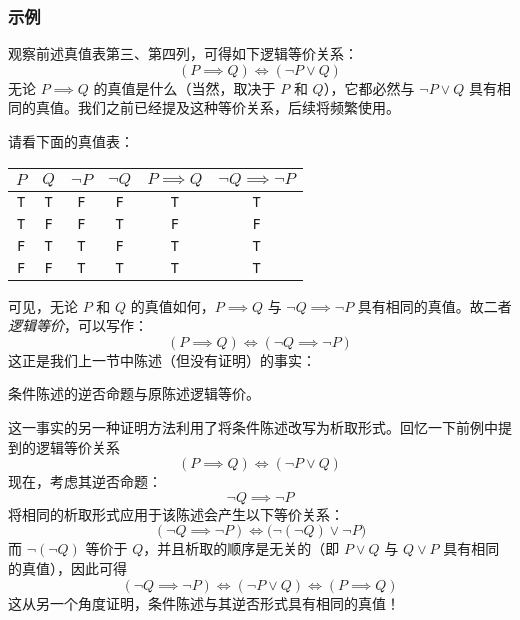 \subsubsection*{示例}

\begin{example}
    观察前述真值表第三、第四列，可得如下逻辑等价关系：
    \[(P \implies Q) \iff (\neg P \lor Q)\]
    无论 $P \implies Q$ 的真值是什么（当然，取决于 $P$ 和 $Q$），它都必然与 $\neg P \lor Q$ 具有相同的真值。我们之前已经提及这种等价关系，后续将频繁使用。
\end{example}

\begin{example}
    请看下面的真值表：
    \begin{center}
        \begin{tabular}{c|c|c|c|c|c}
              $P$      & $Q$      & $\neg P$ &  $\neg Q$  & $P \implies Q$ & $\neg Q \implies \neg P$ \\
              \hline
              \verb|T| & \verb|T| & \verb|F| &  \verb|F|  &    \verb|T|    &    \verb|T|    \\
              \verb|T| & \verb|F| & \verb|F| &  \verb|T|  &    \verb|F|    &    \verb|F|    \\
              \verb|F| & \verb|T| & \verb|T| &  \verb|F|  &    \verb|T|    &    \verb|T|    \\
              \verb|F| & \verb|F| & \verb|T| &  \verb|T|  &    \verb|T|    &    \verb|T|    \\
        \end{tabular}
    \end{center}
    可见，无论 $P$ 和 $Q$ 的真值如何，$P \implies Q$ 与 $\neg Q \implies \neg P$ 具有相同的真值。故二者\emph{逻辑等价}，可以写作：
    \[(P \implies Q) \iff (\neg Q \implies \neg P)\]
    这正是我们上一节中陈述（但没有证明）的事实：
    \begin{center}
        条件陈述的逆否命题与原陈述逻辑等价。
    \end{center}

    这一事实的另一种证明方法利用了将条件陈述改写为析取形式。回忆一下前例中提到的逻辑等价关系
    \[(P \implies Q) \iff (\neg P \lor Q)\]
    现在，考虑其逆否命题：
    \[\neg Q \implies \neg P\]
    将相同的析取形式应用于该陈述会产生以下等价关系：
    \[(\neg Q \implies \neg P) \iff \big(\neg(\neg Q) \lor \neg P\big)\]
    而 $\neg(\neg Q)$ 等价于 $Q$，并且析取的顺序是无关的（即 $P \lor Q$ 与 $Q \lor P$ 具有相同的真值），因此可得
    \[(\neg Q \implies \neg P) \iff (\neg P \lor Q) \iff (P \implies Q)\]
    这从另一个角度证明，条件陈述与其逆否形式具有相同的真值！
\end{example}

